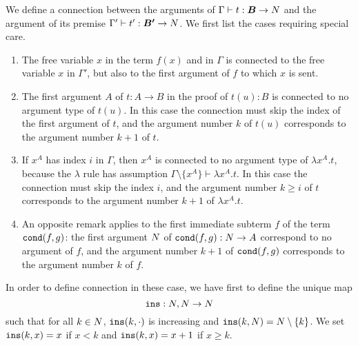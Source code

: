 %
%


We define a connection between the arguments of $\Gamma \vdash t:\vec{B} 
\rightarrow \N$ and the argument of its premise $\Gamma' \vdash t':\vec{B'} 
\rightarrow \N$. We first list the cases requiring special care.
\begin{enumerate}
\item
The free variable $x$ in the term $f(x)$ and in 
$\Gamma$ is connected to the free variable $x$ in $\Gamma'$, but also to the first 
argument of $f$ to which $x$ is sent.
\item
The first argument $A$ of $t:A \rightarrow B$ in the proof of $t(u):B$ is connected 
to no argument type of $t(u)$.
In this case the connection must skip the index of the first argument of $t$,
and the argument number $k$ of $t(u)$ corresponds to the argument number 
$k+1$ of $t$. 
\item
If $x^A$ has index $i$ in $\Gamma$, then $x^A$ is connected 
to no argument type of $\lambda x^A.t$, because the $\lambda$ rule
has assumption $\Gamma \setminus \{x^A\} \vdash \lambda x^A.t$.
In this case the connection must skip the index $i$,
and the argument number $k \ge i $ of $t$ 
corresponds to the argument number $k+1$ of $ \lambda x^A.t$. 
\item
An opposite remark applies to the first immediate subterm $f$ of the
term ${\tt cond}(f,g)$:  the first argument ${N}$ of ${\tt cond}(f,g):{N} \rightarrow A$
correspond to no argument of $f$, and the argument number $k+1$ of 
${\tt cond}(f,g)$ corresponds to the argument number $k$ of $f$. 
\end{enumerate}
In order to define connection in these case, we have first to define the unique
map
\[
{\tt ins}:{N},{N} \rightarrow{N}
\]
such that for all $k \in {N}$, ${\tt ins}(k,\cdot)$ is increasing and
${\tt ins}(k,{N}) = {N} \setminus \{k\}$. 
We set ${\tt ins}(k,x)=x$ if $x < k$ and ${\tt ins}(k,x)=x+1$ if $x \ge k$. 

